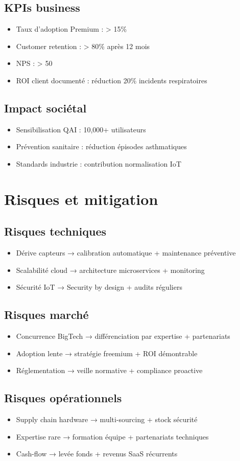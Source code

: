 \documentclass[12pt,a4paper]{article}
\begin{document}
\subsection{KPIs business}
\begin{itemize}
    \item Taux d'adoption Premium : > 15\%
    \item Customer retention : > 80\% après 12 mois
    \item NPS : > 50
    \item ROI client documenté : réduction 20\% incidents respiratoires
\end{itemize}

\subsection{Impact sociétal}
\begin{itemize}
    \item Sensibilisation QAI : 10,000+ utilisateurs
    \item Prévention sanitaire : réduction épisodes asthmatiques
    \item Standards industrie : contribution normalisation IoT
\end{itemize}

\section{Risques et mitigation}
\subsection{Risques techniques}
\begin{itemize}
    \item Dérive capteurs → calibration automatique + maintenance préventive
    \item Scalabilité cloud → architecture microservices + monitoring
    \item Sécurité IoT → Security by design + audits réguliers
\end{itemize}

\subsection{Risques marché}
\begin{itemize}
    \item Concurrence BigTech → différenciation par expertise + partenariats
    \item Adoption lente → stratégie freemium + ROI démontrable
    \item Réglementation → veille normative + compliance proactive
\end{itemize}

\subsection{Risques opérationnels}
\begin{itemize}
    \item Supply chain hardware → multi-sourcing + stock sécurité
    \item Expertise rare → formation équipe + partenariats techniques
    \item Cash-flow → levée fonds + revenus SaaS récurrents
\end{itemize}
\end{document}
